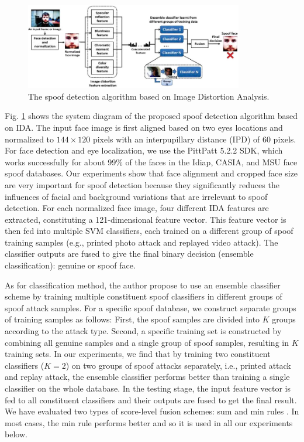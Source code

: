 \documentclass[journal]{IEEEtran}
\begin{document}
\begin{figure}[htbp]
\centering
\includegraphics[width=0.85\textwidth]{img/LDA_system.PNG}
\caption{The spoof detection algorithm based on Image Distortion Analysis.}
\label{lda_system}
\end{figure}
Fig. \ref{lda_system} shows the system diagram of the proposed spoof detection algorithm based on IDA. The input face image is first aligned based on two eyes locations and normalized to $144\times 120$ pixels with an interpupillary distance (IPD) of 60 pixels. For face detection and eye localization, we use the PittPatt 5.2.2 SDK, which works successfully for about 99\% of the faces in the Idiap, CASIA, and MSU face spoof databases. Our experiments show that face alignment and cropped face size are very important for spoof detection because they significantly reduces the influences of facial and background variations that are irrelevant to spoof detection. For each normalized face image, four different IDA features are extracted, constituting a 121-dimensional feature vector. This feature vector is then fed into multiple SVM classifiers, each trained on a different group of spoof training samples (e.g., printed photo attack and replayed video attack). The classifier outputs are fused to give the final binary decision (ensemble classification): genuine or spoof face.

As for classification method, the author propose to use an ensemble classifier scheme by training multiple constituent spoof classifiers in different groups of spoof attack samples. For a specific spoof database, we construct separate groups of training samples as follows: First, the spoof samples are divided into $K$ groups according to the attack type. Second, a specific training set is constructed by combining all genuine samples and a single group of spoof samples, resulting in $K$ training sets. In our experiments, we find that by training two constituent classifiers ($K = 2$) on two groups of spoof attacks separately, i.e., printed attack and replay attack, the ensemble classifier performs better than training a single classifier on the whole database. In the testing stage, the input feature vector is fed to all constituent classifiers and their outputs are fused to get the final result. We have evaluated two types of score-level fusion
schemes: sum and min rules \cite{jain2005score}. In most cases, the min rule performs better and so it is used in all our experiments below.
\end{document}
